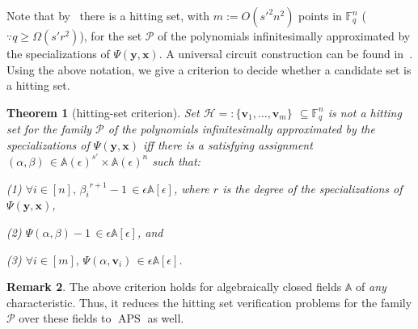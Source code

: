 \documentclass[11pt]{article}
\numberwithin{equation}{section}
\newtheorem{theorem}{Theorem}[section]
\theoremstyle{definition}
\newtheorem{remark}[theorem]{Remark}
\theoremstyle{plain}
\newcommand{\F}{\mathbb{F}}
\newcommand{\calH}{\mathcal{H}}
\newcommand{\calP}{\mathcal{P}}
\newcommand{\aff}{\mathbb{A}}
\DeclareMathOperator{\APS}{\mathrm{APS}\xspace} %
\begin{document}
Note that by~\cite{heintz1980testing} there is a hitting set, with $m:=O(s'^2n^2)$ points in $\F_q^n$ ($\because q\ge\Omega(s'r^2)$), 
%
for the set $\calP$ of the polynomials %
infinitesimally approximated by the specializations of $\Psi(\mathbf{y},\mathbf{x})$.
A universal circuit construction can be found in~\cite{raz2008elusive, shpilka2010arithmetic}. 
Using the above notation, we give a criterion to decide whether a candidate set is a hitting set. 

\begin{theorem}[hitting-set criterion]\label{thm_HITTING}
Set $\calH=:\{\mathbf v_1,\ldots, \mathbf v_m\}$ $\subseteq \F_q^n$ is \emph{not} a hitting set 
%
for the family $\calP$ of the polynomials %
infinitesimally approximated by the specializations of $\Psi(\mathbf{y},\mathbf{x})$ iff there is a satisfying assignment $(\alpha, \beta)\,\in \aff(\epsilon)^{s'}\times \aff(\epsilon)^{n}$ such that:

\smallskip\noindent
(1) $\forall i \in [n],\, {\beta_i}^{r+1}- 1 \,\in \epsilon\aff[\epsilon]$, where $r$ is the degree of the  specializations of $\Psi(\mathbf{y},\mathbf{x})$,  

\noindent 
(2) $\Psi(\alpha, \beta) - 1 \,\in \epsilon\aff[\epsilon]$, and

\noindent
(3) $\forall i \in [m],\, \Psi(\alpha,\mathbf{v}_i) \,\in \epsilon\aff[\epsilon]$.
\end{theorem}

%
\begin{remark}   %
The above criterion holds for algebraically closed fields $\aff$ of \emph{any} characteristic. Thus, it reduces 
%
the hitting set verification problems for the family $\calP$ over these fields %
to $\APS$ as well.
\end{remark}
\end{document}
